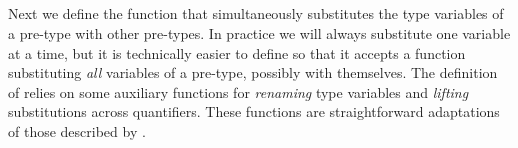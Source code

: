 \begin{code}[hide]
\AgdaSpace{}%
\AgdaSymbol{)}\<%
\\
%
\\[\AgdaEmptyExtraSkip]%
\>[0]\AgdaSpace{}%
\AgdaSymbol{:}\AgdaSpace{}%
\AgdaSpace{}%
\AgdaSymbol{\}}\AgdaSpace{}%
\AgdaSpace{}%
\AgdaSymbol{(}\AgdaSpace{}%
\AgdaSpace{}%
\AgdaSpace{}%
\AgdaSpace{}%
\AgdaSymbol{)}\AgdaSpace{}%
\AgdaSpace{}%
\AgdaSpace{}%
\AgdaSymbol{(}\AgdaSpace{}%
\AgdaSymbol{)}\AgdaSpace{}%
\AgdaSpace{}%
\AgdaSpace{}%
\AgdaSymbol{(}\AgdaSpace{}%
\AgdaSymbol{)}\<%
\\
\>[0]\AgdaSpace{}%
\AgdaSpace{}%
\AgdaSpace{}%
\AgdaSymbol{=}\AgdaSpace{}%
\AgdaSpace{}%
\<%
\\
\>[0]\AgdaSpace{}%
\AgdaSpace{}%
\AgdaSymbol{(}\AgdaSpace{}%
\AgdaSymbol{)}\AgdaSpace{}%
\AgdaSymbol{=}\AgdaSpace{}%
\AgdaSpace{}%
\AgdaSpace{}%
\AgdaSymbol{(}\AgdaSpace{}%
\AgdaSymbol{)}\<%
\end{code}

Next we define the function  that simultaneously substitutes
the type variables of a pre-type with other pre-types. In practice we will
always substitute one variable at a time, but it is technically easier to define
 so that it accepts a function substituting \emph{all}
variables of a pre-type, possibly with themselves. The definition of
 relies on some auxiliary functions for \emph{renaming} type
variables and \emph{lifting} substitutions across quantifiers. These functions
are straightforward adaptations of those described by \citet{KokkeSiekWadler20}.

